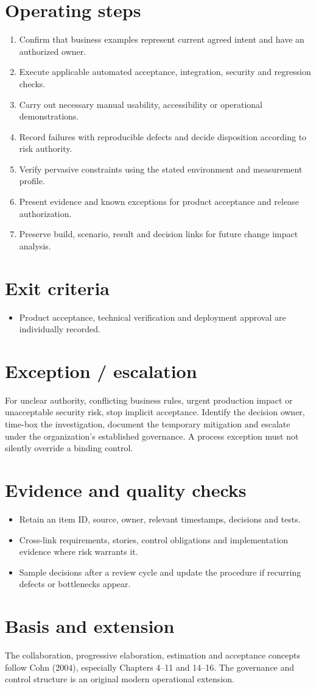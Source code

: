 \documentclass[11pt,letterpaper]{article}
\begin{document}
\section{Operating steps}
\begin{enumerate}[leftmargin=*,itemsep=3pt]
\item Confirm that business examples represent current agreed intent and have an authorized owner.
\item Execute applicable automated acceptance, integration, security and regression checks.
\item Carry out necessary manual usability, accessibility or operational demonstrations.
\item Record failures with reproducible defects and decide disposition according to risk authority.
\item Verify pervasive constraints using the stated environment and measurement profile.
\item Present evidence and known exceptions for product acceptance and release authorization.
\item Preserve build, scenario, result and decision links for future change impact analysis.
\end{enumerate}
\section{Exit criteria}
\begin{itemize}[leftmargin=*,itemsep=2pt]
\item Product acceptance, technical verification and deployment approval are individually recorded.
\end{itemize}
\section{Exception / escalation}
For unclear authority, conflicting business rules, urgent production impact or unacceptable security risk, stop implicit acceptance. Identify the decision owner, time-box the investigation, document the temporary mitigation and escalate under the organization’s established governance. A process exception must not silently override a binding control.

\section{Evidence and quality checks}
\begin{itemize}[leftmargin=*,itemsep=2pt]
\item Retain an item ID, source, owner, relevant timestamps, decisions and tests.
\item Cross-link requirements, stories, control obligations and implementation evidence where risk warrants it.
\item Sample decisions after a review cycle and update the procedure if recurring defects or bottlenecks appear.
\end{itemize}
\section{Basis and extension}
The collaboration, progressive elaboration, estimation and acceptance concepts follow Cohn (2004), especially Chapters 4–11 and 14–16. The governance and control structure is an original modern operational extension.
\end{document}
